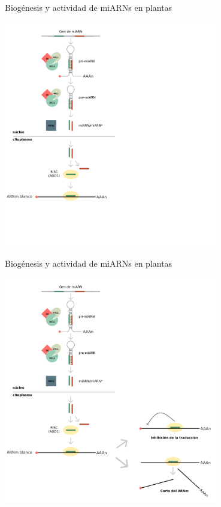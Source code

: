 \documentclass{beamer}
\begin{document}
\begin{frame}{Biogénesis y actividad de miARNs en plantas}
	\begin{center}
		\includegraphics[width=0.7\textwidth]{img/biogenesis_accion_defensa05.png}
	\end{center}
\end{frame}

\begin{frame}{Biogénesis y actividad de miARNs en plantas}
	\begin{center}
		\includegraphics[width=0.7\textwidth]{img/biogenesis_accion_defensa06.png}
	\end{center}
\end{frame}
\end{document}
